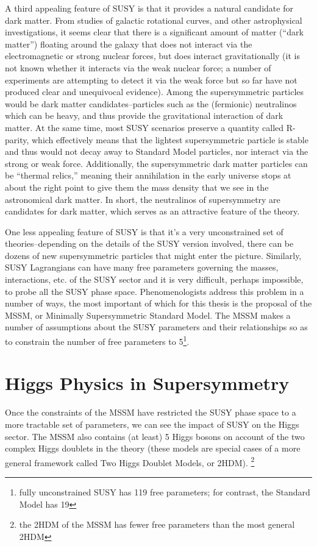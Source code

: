 A third appealing feature of SUSY is that it provides a natural candidate for dark 
matter.  From studies of galactic rotational curves, and other astrophysical investigations, it 
seems clear that there is a significant amount of matter (``dark matter'') floating 
around the galaxy that does not interact via the electromagnetic or strong nuclear forces, 
but does interact gravitationally (it is not known whether it interacts via the weak 
nuclear force; a number of experiments are attempting to detect it via the weak 
force but so far have not produced clear and unequivocal evidence).  Among the supersymmetric 
particles would be dark matter candidates--particles such as the (fermionic) neutralinos 
which can be heavy, and thus provide the gravitational interaction of dark matter.  
At the same time, most SUSY scenarios preserve a quantity called R-parity, 
which effectively means that the lightest supersymmetric particle is stable and thus 
would not decay away to Standard Model particles, nor interact via the strong or 
weak force.  Additionally, the supersymmetric dark matter particles can be ``thermal
relics,'' meaning their annihilation in the early universe stops at about the right
point to give them the mass density that we see in the astronomical dark matter.
In short, the neutralinos of supersymmetry are candidates for dark matter, 
which serves as an attractive feature of the theory. 


One less appealing feature of SUSY is that it's a very unconstrained set 
of theories--depending on the details of the SUSY version involved, there can 
be dozens of new supersymmetric particles that might enter 
the picture.  Similarly, SUSY Lagrangians can have many free parameters governing the masses, 
interactions, etc. of the SUSY sector and it is very difficult, perhaps 
impossible, to probe all the SUSY phase space.  Phenomenologists address this problem in 
a number of ways, the most important of which for this thesis is the 
proposal of the MSSM, or Minimally Supersymmetric Standard Model.  The MSSM makes a 
number of assumptions about the SUSY parameters and their relationships so as to constrain the 
number of free parameters to 5\footnote{fully unconstrained SUSY has 119 free parameters; for
contrast, the Standard Model has 19}.  

\section{Higgs Physics in Supersymmetry}
\label{sec:SUSY_Higgs}
Once the constraints of the MSSM have restricted the SUSY phase space to a more 
tractable set of parameters, we can see the impact of SUSY on the Higgs sector.  
The MSSM also contains (at least) 5 Higgs bosons on account of the 
two complex Higgs doublets in the theory (these models are 
special cases of a more general framework called Two Higgs Doublet Models, or 2HDM).
\footnote{the 2HDM of the MSSM has fewer free parameters than the most general 2HDM}  

